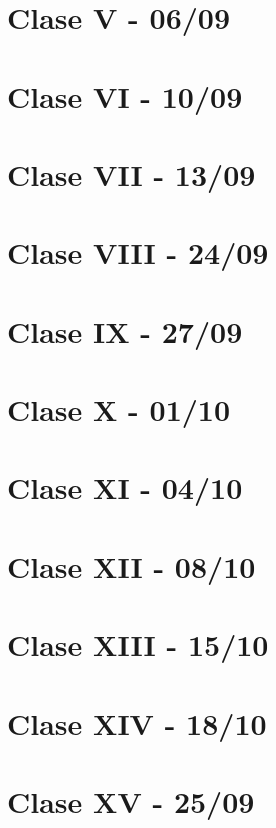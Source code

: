 \documentclass[12pt,a4paper]{book}
\begin{document}
\chapter{Clase V - 06/09}


\chapter{Clase VI - 10/09}


\chapter{Clase VII - 13/09}


\chapter{Clase VIII - 24/09}


\chapter{Clase IX - 27/09}


\chapter{Clase X - 01/10}


\chapter{Clase XI - 04/10}


\chapter{Clase XII - 08/10}


\chapter{Clase XIII - 15/10}


\chapter{Clase XIV - 18/10}


\chapter{Clase XV - 25/09}

\end{document}
